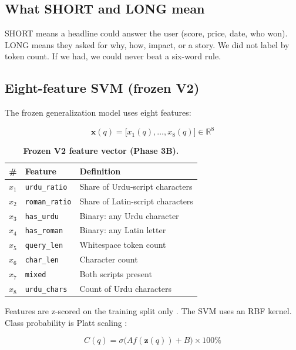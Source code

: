\subsection*{What SHORT and LONG mean}
\label{sec:labels}

SHORT means a headline could answer the user (score, price, date, who won). LONG means they asked for why, how, impact, or a story. We did not label by token count. If we had, we could never beat a six-word rule.

\subsection*{Eight-feature SVM (frozen V2)}
\label{sec:features}

The frozen generalization model uses eight features:

\begin{equation}
\mathbf{x}(q) = \big[x_1(q),\ldots,x_8(q)\big] \in \mathbb{R}^{8}
\label{eq:featurevec}
\end{equation}

\begin{table}[H]
\centering
\caption{\textbf{Frozen V2 feature vector (Phase 3B).}}
\label{tab:features}
\small
\begin{tabular}{clp{4.2cm}}
\toprule
\textbf{\#} & \textbf{Feature} & \textbf{Definition} \\
\midrule
$x_1$ & \texttt{urdu\_ratio} & Share of Urdu-script characters \\
$x_2$ & \texttt{roman\_ratio} & Share of Latin-script characters \\
$x_3$ & \texttt{has\_urdu} & Binary: any Urdu character \\
$x_4$ & \texttt{has\_roman} & Binary: any Latin letter \\
$x_5$ & \texttt{query\_len} & Whitespace token count \\
$x_6$ & \texttt{char\_len} & Character count \\
$x_7$ & \texttt{mixed} & Both scripts present \\
$x_8$ & \texttt{urdu\_chars} & Count of Urdu characters \\
\bottomrule
\end{tabular}
\end{table}

Features are z-scored on the training split only \cite{cortes1995svm}. The SVM uses an RBF kernel. Class probability is Platt scaling \cite{guo2017calibration}:

\begin{equation}
C(q) = \sigma\big(A f(\mathbf{z}(q)) + B\big) \times 100\%
\label{eq:confidence}
\end{equation}

